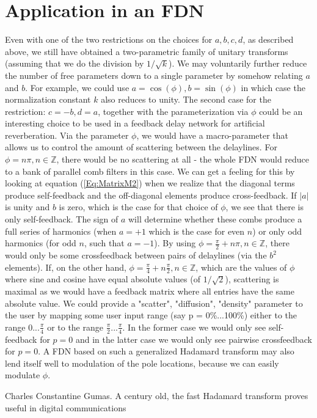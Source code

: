 \section{Application in an FDN}
Even with one of the two restrictions on the choices for $a, b, c, d$, as described above, we still have obtained a two-parametric family of unitary transforms (assuming that we do the division by $1 / \sqrt{k}$). We may voluntarily further reduce the number of free parameters down to a single parameter by somehow relating $a$ and $b$. For example, we could use $a = \cos(\phi), b = \sin(\phi)$ in which case the normalization constant $k$ also reduces to unity. The second case for the restriction: $c=-b, d=a$, together with the parameterization via $\phi$ could be an interesting choice to be used in a feedback delay network for artificial reverberation. Via the parameter $\phi$, we would have a macro-parameter that allows us to control the amount of scattering between the delaylines. For $\phi = n \pi, n \in \mathbb{Z}$, there would be no scattering at all - the whole FDN would reduce to a bank of parallel comb filters in this case. We can get a feeling for this by looking at equation (\ref{Eq:MatrixM2}) when we realize that the diagonal terms produce self-feedback and the off-diagonal elements produce cross-feedback. If $|a|$ is unity and $b$ is zero, which is the case for that choice of $\phi$, we see that there is only self-feedback. The sign of $a$ will determine whether these combs produce a full series of harmonics (when $a=+1$ which is the case for even $n$) or only odd harmonics (for odd $n$, such that $a=-1$). By using $\phi = \frac{\pi}{2} + n \pi, n \in \mathbb{Z}$, there would only be some crossfeedback between pairs of delaylines (via the $b^2$ elements). If, on the other hand, $\phi = \frac{\pi}{4} + n \frac{\pi}{2}, n \in \mathbb{Z}$, which are the values of $\phi$ where sine and cosine have equal absolute values (of $1 / \sqrt{2}$), scattering is maximal as we would have a feedback matrix where all entries have the same absolute value. We could provide a "scatter", "diffusion", "density" parameter to the user by mapping some user input range (say p = 0\%...100\%) either to the range $0...\frac{\pi}{4}$ or to the range $\frac{\pi}{2}...\frac{\pi}{4}$. In the former case we would only see self-feedback for $p=0$ and in the latter case we would only see pairwise crossfeedback for $p=0$. A FDN based on such a generalized Hadamard transform may also lend itself well to modulation of the pole locations, because we can easily modulate $\phi$.























\begin{thebibliography}{9}  %
  Charles Constantine Gumas. A century old, the fast Hadamard transform proves useful in digital communications
\end{thebibliography}

